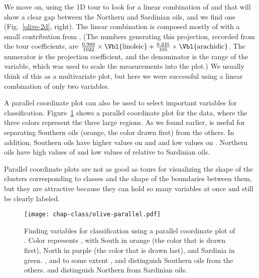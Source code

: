 We move on, using the 1D tour  to look for a linear
combination of  and  that will show a
clear gap between the Northern and Sardinian oils, and we find one
(Fig.~\ref{olive-2d}, right).  The linear combination is composed
mostly of  with a small contribution from
. (The numbers generating this projection, recorded
from the tour coefficients, are $\frac{0.969}{1022}\times
\mbox{\Vbl{linoleic}} + \frac{0.245}{105}\times \mbox{\Vbl{arachidic}}$. 
The numerator is the projection coefficient, and the denominator is the
range of the variable, which was used to scale the measurements into
the plot.)  We usually think of this as a multivariate plot, but here
we were successful using a linear combination of only two variables.

\bigskip
{}
 A parallel coordinate plot can also
be used to select important variables for
classification. Figure~\ref{olive-parallel} shows a parallel coordinate
plot for the  data, where the three colors represent
the three large regions. As we found earlier,  is
useful for separating Southern oils (orange, the color drawn first)
from the others.  In addition, Southern oils have higher values on
 and  and low values on .
Northern oils have high values of  and low values of
 relative to Sardinian oils.

Parallel coordinate plots are not as good as tours for visualizing the
shape of the clusters corresponding to classes and the shape of the
boundaries between them, but they are attractive because they can hold
so many variables at once and still be clearly labeled.

\begin{figure}[htp]
\centerline{\texttt{[image: chap-class/olive-parallel.pdf]}}
\caption[Finding variables for classification using a parallel
coordinate plot of ]{Finding variables for
classification using a parallel coordinate plot of .
Color represents , with South in orange (the color that is
drawn first), North in purple (the color that is drawn last), and
Sardinia in green. , and to some extent
,  and  distinguish Southern
oils from the others.  and  distinguish
Northern from Sardinian oils.}
\label{olive-parallel}
\end{figure}

